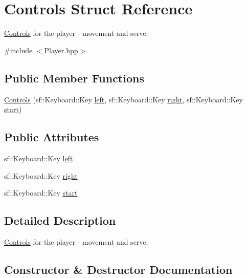 \hypertarget{struct_controls}{}\section{Controls Struct Reference}
\label{struct_controls}


\mbox{\hyperlink{struct_controls}{Controls}} for the player -\/ movement and serve.  




{\ttfamily \#include $<$Player.\+hpp$>$}

\subsection*{Public Member Functions}
\begin{DoxyCompactItemize}
\item 
\mbox{\hyperlink{struct_controls_a7c95ee06840828f979b7eb0bf4b23bf9}{Controls}} (sf\+::\+Keyboard\+::\+Key \mbox{\hyperlink{struct_controls_a67ae975a4254a72c796681a7c8c850da}{left}}, sf\+::\+Keyboard\+::\+Key \mbox{\hyperlink{struct_controls_ac0b4b73fa43e078cc66a4e531cdc9623}{right}}, sf\+::\+Keyboard\+::\+Key \mbox{\hyperlink{struct_controls_a83bddc1c685070d19f0b509f3bf301f0}{start}})
\end{DoxyCompactItemize}
\subsection*{Public Attributes}
\begin{DoxyCompactItemize}
\item 
sf\+::\+Keyboard\+::\+Key \mbox{\hyperlink{struct_controls_a67ae975a4254a72c796681a7c8c850da}{left}}
\item 
sf\+::\+Keyboard\+::\+Key \mbox{\hyperlink{struct_controls_ac0b4b73fa43e078cc66a4e531cdc9623}{right}}
\item 
sf\+::\+Keyboard\+::\+Key \mbox{\hyperlink{struct_controls_a83bddc1c685070d19f0b509f3bf301f0}{start}}
\end{DoxyCompactItemize}


\subsection{Detailed Description}
\mbox{\hyperlink{struct_controls}{Controls}} for the player -\/ movement and serve. 

\subsection{Constructor \& Destructor Documentation}
\mbox{\label{struct_controls_a7c95ee06840828f979b7eb0bf4b23bf9}} 
